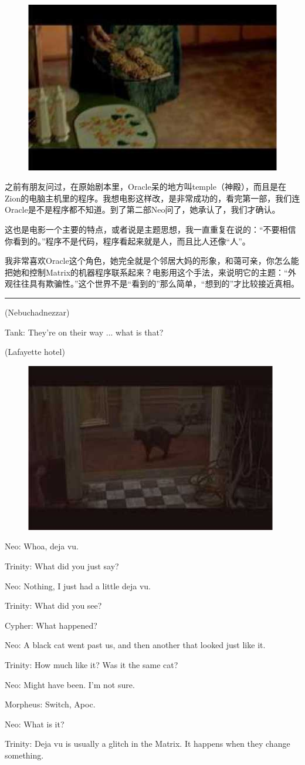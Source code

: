 \documentclass[UTF8]{ctexart}
\newcommand{\myparsep}{\noindent \rule[0.5ex]{\linewidth}{1pt}}
\newenvironment{myquote}{\color{green} \setlength{\leftskip}{6em} \setlength{\rightskip}{4em} \setlength{\parindent}{-2em}}{\par}
\begin{document}
\begin{figure}[htb]
\centering
\includegraphics[width=0.5\linewidth]{fig/read_Matrix-51}
\end{figure}

之前有朋友问过，在原始剧本里，Oracle呆的地方叫temple（神殿），而且是在Zion的电脑主机里的程序。我想电影这样改，是非常成功的，看完第一部，我们连Oracle是不是程序都不知道。到了第二部Neo问了，她承认了，我们才确认。

这也是电影一个主要的特点，或者说是主题思想，我一直重复在说的：“不要相信你看到的。”程序不是代码，程序看起来就是人，而且比人还像“人”。

我非常喜欢Oracle这个角色，她完全就是个邻居大妈的形象，和蔼可亲，你怎么能把她和控制Matrix的机器程序联系起来？电影用这个手法，来说明它的主题：“外观往往具有欺骗性。”这个世界不是“看到的”那么简单，“想到的”才比较接近真相。

\myparsep

\begin{myquote}
(Nebuchadnezzar)

Tank: They're on their way ... what is that?

(Lafayette hotel)

\begin{figure}[htb]
\centering
\includegraphics[width=0.5\linewidth]{fig/read_Matrix-53}
\end{figure}

Neo: Whoa, deja vu.

Trinity: What did you just say?

Neo: Nothing, I just had a little deja vu.

Trinity: What did you see?

Cypher: What happened?

Neo: A black cat went past us, and then another that looked just like it.

Trinity: How much like it? Was it the same cat?

Neo: Might have been. I'm not sure.

Morpheus: Switch, Apoc.

Neo: What is it?

Trinity: Deja vu is usually a glitch in the Matrix. It happens when they change something.
\end{myquote}
\end{document}
